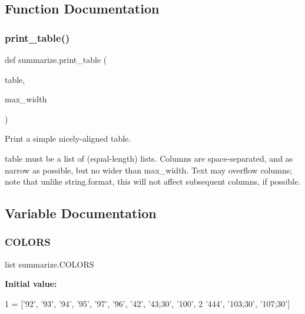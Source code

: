 \subsection{Function Documentation}
\mbox{\label{namespacesummarize_aed3c88b7cc0075038238f0a5d153cd65}} 
\subsubsection{\texorpdfstring{print\+\_\+table()}{print\_table()}}
{\footnotesize\ttfamily def summarize.\+print\+\_\+table (\begin{DoxyParamCaption}\item[{}]{table,  }\item[{}]{max\+\_\+width }\end{DoxyParamCaption})}

\begin{DoxyVerb}Print a simple nicely-aligned table.

table must be a list of (equal-length) lists. Columns are space-separated,
and as narrow as possible, but no wider than max_width. Text may overflow
columns; note that unlike string.format, this will not affect subsequent
columns, if possible.\end{DoxyVerb}
 

\subsection{Variable Documentation}
\mbox{\label{namespacesummarize_ace787d530d7719206a169bca48236bb3}} 
\subsubsection{\texorpdfstring{C\+O\+L\+O\+RS}{COLORS}}
{\footnotesize\ttfamily list summarize.\+C\+O\+L\+O\+RS}

{\bfseries Initial value\+:}
\begin{DoxyCode}
1 =  [\textcolor{stringliteral}{'92'}, \textcolor{stringliteral}{'93'}, \textcolor{stringliteral}{'94'}, \textcolor{stringliteral}{'95'}, \textcolor{stringliteral}{'97'}, \textcolor{stringliteral}{'96'}, \textcolor{stringliteral}{'42'}, \textcolor{stringliteral}{'43;30'}, \textcolor{stringliteral}{'100'},
2           \textcolor{stringliteral}{'444'}, \textcolor{stringliteral}{'103;30'}, \textcolor{stringliteral}{'107;30'}]
\end{DoxyCode}
